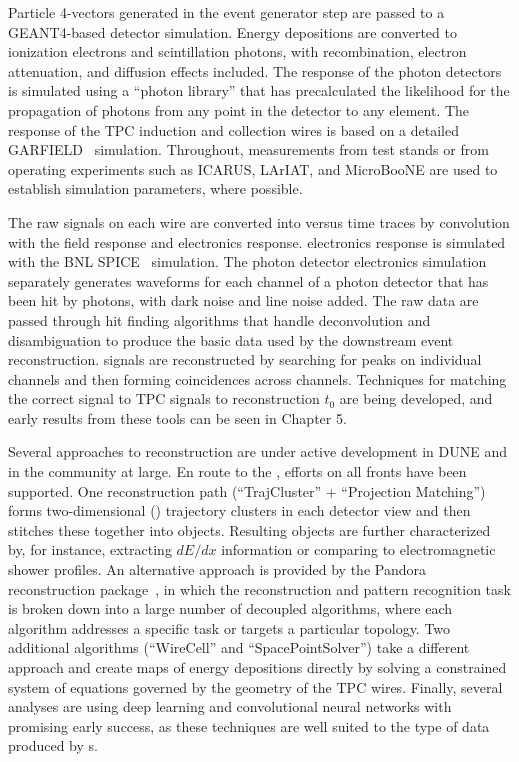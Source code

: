 Particle 4-vectors generated in the event generator step are passed to a {\sc GEANT4}-based detector simulation.  Energy depositions are converted to ionization electrons and scintillation photons, with recombination, electron attenuation, and diffusion effects included.  The response of the photon detectors is simulated using a ``photon library'' that has precalculated the likelihood for the propagation of photons from any point in the detector to any  element.  The response of the TPC induction and collection wires is based on a detailed GARFIELD~\cite{garfield} simulation.  Throughout, measurements from test stands or from operating \lartpc experiments such as ICARUS, LArIAT, and MicroBooNE are used to establish simulation parameters, where possible.

The raw signals on each wire are converted into  versus time traces by convolution with the field response and electronics response.   electronics response is simulated with the BNL SPICE~\cite{spice} simulation.  The photon detector electronics simulation separately generates waveforms for each channel of a photon detector that has been hit by photons, with dark noise and line noise added.  The raw data are passed through hit finding algorithms that handle deconvolution and disambiguation to produce the basic data used by the downstream event reconstruction.  signals are reconstructed by searching for peaks on individual channels and then forming coincidences across channels. Techniques for matching the correct  signal to TPC signals to reconstruction $t_0$ are being developed, and early results from these tools can be seen in \voltitlespfd Chapter 5. 

Several approaches to \lartpc reconstruction are under active development in DUNE and in the community at large.  En route to the , efforts on all fronts have been supported.  One  reconstruction path (``TrajCluster'' + ``Projection Matching'') forms two-dimensional (\twod) trajectory clusters in each detector view and then stitches these together into \threed objects.  Resulting objects are further characterized by, for instance, extracting $dE/dx$ information or comparing to electromagnetic shower profiles.  An alternative approach is provided by the Pandora reconstruction package~\cite{Marshall:2015rfa}, in which the reconstruction and pattern recognition task is broken down into a large number of decoupled algorithms, where each algorithm addresses a specific task or targets a particular topology.  Two additional algorithms (``WireCell'' and ``SpacePointSolver'') take a different approach and create \threed maps of energy depositions directly by solving a constrained system of equations governed by the geometry of the TPC wires.  Finally, several analyses are using deep learning and convolutional neural networks with promising early success, as these techniques are well suited to the type of data produced by \lartpc{}s.

